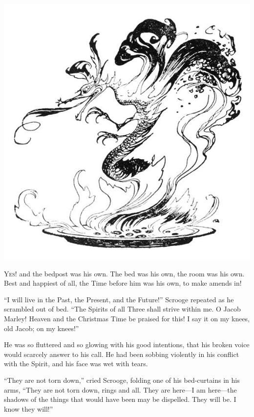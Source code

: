 \documentclass[paper=a5,BCOR=15mm,twoside,DIV=15,headinclude=off,12pt,chapterprefix=off,openany,headings=huge]{scrbook} %
\begin{document}
\begin{minipage}[c]{\linewidth}
\includegraphics[width=\linewidth]{gs168}
\end{minipage}

\lettrine[loversize=.85]{Y}{es!} and the bedpost was his own. The bed was his own, the room was his own. Best and happiest of all, the Time before him was his own, to make amends in!

\enquote{I will live in the Past, the Present, and the Future!} Scrooge repeated as he scrambled out of bed. \enquote{The Spirits of all Three shall strive within me. O Jacob Marley! Heaven and the Christmas Time be praised for this! I say it on my knees, old Jacob; on my knees!}

He was so fluttered and so glowing with his good intentions, that his broken voice would scarcely answer to his call. He had been sobbing violently in his conflict with the Spirit, and his face was wet with tears.

\enquote{They are not torn down,} cried Scrooge, folding one of his bed-curtains in his arms, \enquote{They are not torn down, rings and all. They are here—I am here—the shadows of the things that would have been may be dispelled. They will be. I know they will!}
\end{document}
